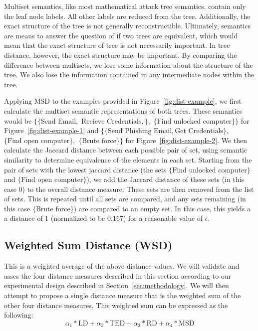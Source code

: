 Multiset semantics, like most mathematical attack tree semantics, contain only the leaf node labels. All other labels are reduced from the tree. Additionally, the exact structure of the tree is not generally reconstructible. Ultimately, semantics are means to answer the question of if two trees are equivalent, which would mean that the exact structure of tree is not necessarily important. In tree distance, however, the exact structure may be important. By comparing the difference between multisets, we lose some information about the structure of the tree. We also lose the information contained in any intermediate nodes within the tree.

Applying MSD to the examples provided in Figure~\ref{fig:dist-example}, we first calculate the multiset semantic representations of both trees. These semantics would be $\{\{\text{Send Email},$ $\text{Recieve Credentials},\},$ $\{\text{Find unlocked computer}\}\}$ for Figure~\ref{fig:dist-example-1} and $\{\{\text{Send Phishing Email}, \text{Get Credentials}\},$ $\{\text{Find open computer}\},$ $\{\text{Brute force}\}\}$ for Figure~\ref{fig:dist-example-2}. We then calculate the Jaccard distance between each possible pair of set, using semantic similarity to determine equivalence of the elements in each set. Starting from the pair of sets with the lowest jaccard distance (the sets $\{\text{Find unlocked computer}\}$ and $\{\text{Find open computer}\}$), we add the Jaccard distance of these sets (in this case 0) to the overall distance measure. These sets are then removed from the list of sets. This is repeated until all sets are compared, and any sets remaining (in this case $\{\text{Brute force}\}$) are compared to an empty set. In this case, this yields a a distance of 1 (normalized to be 0.167) for a reasonable value of $\epsilon$.



\subsection{Weighted Sum Distance (WSD)}
\label{ssec:wsd}

This is a weighted average of the above distance values. We will validate and asses the four distance measures described in this section according to our experimental design described in Section~\ref{sec:methodology}. We will then attempt to propose a single distance measure that is the weighted sum of the other four distance measures. This weighted sum can be expressed as the following:
\[
    \alpha_1*\text{LD}+ \alpha_2*\text{TED} + \alpha_3*\text{RD} + \alpha_4*\text{MSD}
\]

